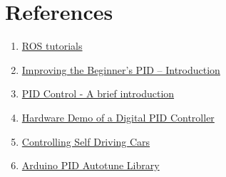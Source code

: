 \documentclass[a4paper,12pt,oneside]{book}
\begin{document}

\section{References}
    \begin{enumerate}
        \item \href{http://wiki.ros.org/ROS/Tutorials}{ROS tutorials}
        \item \href{http://brettbeauregard.com/blog/2011/04/improving-the-beginners-pid-introduction/}{Improving the Beginner’s PID – Introduction}
        \item \href{https://www.youtube.com/watch?v=UR0hOmjaHp0&list=PLUMWjy5jgHK20UW0yM2    2HYEUTMJfla7Mb}{PID Control - A brief introduction}
        \item \href{https://www.youtube.com/watch?v=fusr9eTceEo}{Hardware Demo of a Digital PID Controller}
        \item \href{https://www.youtube.com/watch?v=4Y7zG48uHRo}{Controlling Self Driving Cars}
         \item \href{http://brettbeauregard.com/blog/2012/01/arduino-pid-autotune-library/}{Arduino PID Autotune Library} 
        
    \end{enumerate}
\end{document}
